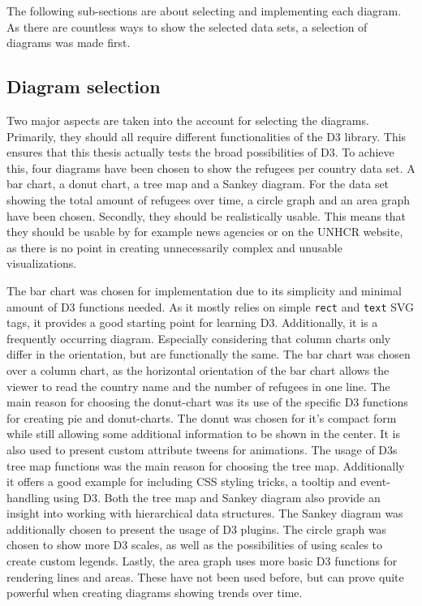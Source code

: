 The following sub-sections are about selecting and implementing each diagram. As there are countless ways to show the selected data sets, a selection of diagrams was made first.

\subsection{Diagram selection} \label{sec:diagram-selection}
Two major aspects are taken into the account for selecting the diagrams. Primarily, they should all require different functionalities of the D3 library. This ensures that this thesis actually tests the broad possibilities of D3. To achieve this, four diagrams have been chosen to show the refugees per country data set. A bar chart, a donut chart, a tree map and a Sankey diagram. For the data set showing the total amount of refugees over time, a circle graph and an area graph have been chosen.
Secondly, they should be realistically usable. This means that they should be usable by for example news agencies or on the UNHCR website, as there is no point in creating unnecessarily complex and unusable visualizations.

The bar chart was chosen for implementation due to its simplicity and minimal amount of D3 functions needed. As it mostly relies on simple \texttt{rect} and \texttt{text} SVG tags, it provides a good starting point for learning D3. Additionally, it is a frequently occurring diagram. Especially considering that column charts only differ in the orientation, but are functionally the same. The bar chart was chosen over a column chart, as the horizontal orientation of the bar chart allows the viewer to read the country name and the number of refugees in one line.
The main reason for choosing the donut-chart was its use of the specific D3 functions for creating pie and donut-charts. The donut was chosen for it's compact form while still allowing some additional information to be shown in the center. It is also used to present custom attribute tweens for animations.
The usage of D3s tree map functions was the main reason for choosing the tree map. Additionally it offers a good example for including CSS styling tricks, a tooltip and event-handling using D3.
Both the tree map and Sankey diagram also provide an insight into working with hierarchical data structures. The Sankey diagram was additionally chosen to present the usage of D3 plugins.
The circle graph was chosen to show more D3 scales, as well as the possibilities of using scales to create custom legends.
Lastly, the area graph uses more basic D3 functions for rendering lines and areas. These have not been used before, but can prove quite powerful when creating diagrams showing trends over time.

